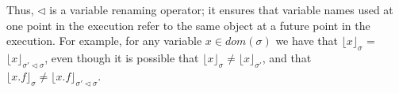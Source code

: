 \documentclass[11pt]{amsart}
\newcommand{\prg}[1]{\texttt{#1}}
\begin{document}
Thus, $\triangleleft$ is a variable renaming operator; it ensures that variable names 
used at one point in the execution refer to the same object at a future point in the execution. 
For example, for any variable $x \in dom(\sigma)$ we have that $\lfloor x \rfloor_\sigma$ = $\lfloor x \rfloor_{\sigma' \triangleleft \sigma}$, even though it is possible that $\lfloor x \rfloor_\sigma \neq \lfloor x \rfloor_{\sigma'}$, and that
$\lfloor x.f \rfloor_\sigma \neq \lfloor x.f \rfloor_{\sigma' \triangleleft \sigma}$.

%
%
%
%

\end{document}
